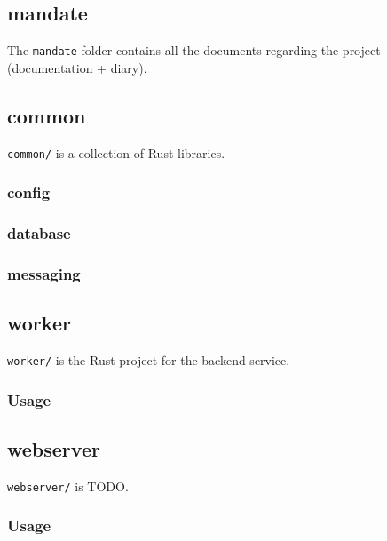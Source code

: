 \documentclass[../documentation.tex]{subfiles}
\begin{document}
\subsection{mandate}

The \texttt{mandate} folder contains all the documents regarding
the project (documentation + diary).

\subsection{common}

\texttt{common/} is a collection of Rust libraries.

\subsubsection{config}

\subsubsection{database}

\subsubsection{messaging}

\subsection{worker}

\texttt{worker/} is the Rust project for the backend service.

\subsubsection{Usage}

\subsection{webserver}

\texttt{webserver/} is TODO.

\subsubsection{Usage}
\end{document}
